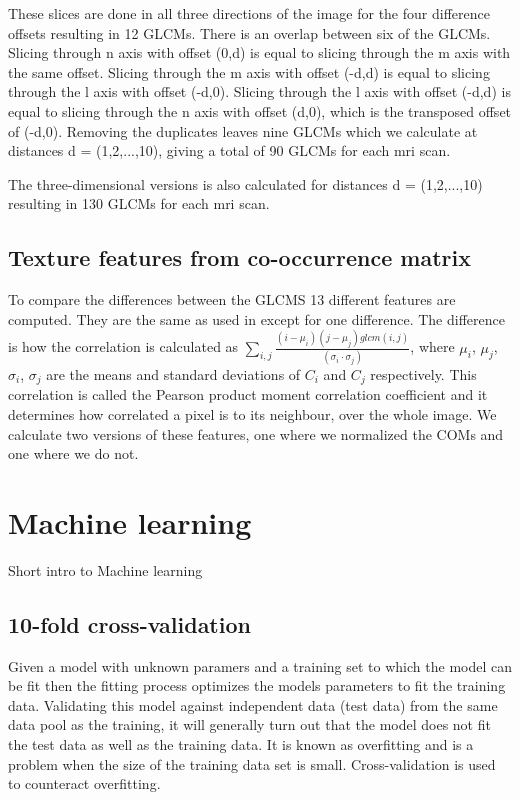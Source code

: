 These slices are done in all three directions of the image for the four difference offsets resulting in 12 GLCMs. There is an overlap between six of the GLCMs. Slicing through n axis with offset (0,d) is equal to slicing through the m axis with the same offset. Slicing through the m axis with offset (-d,d) is equal to slicing through the l axis with offset (-d,0). Slicing through the l axis with offset (-d,d) is equal to slicing through the n axis with offset (d,0), which is the transposed offset of (-d,0). Removing the duplicates leaves nine GLCMs which we calculate at distances d = (1,2,...,10), giving a total of 90 GLCMs for each mri scan.

The three-dimensional versions is also calculated for distances d = (1,2,...,10) resulting in 130 GLCMs for each mri scan.

\subsection{Texture features from co-occurrence matrix}
To compare the differences between the GLCMS 13 different features are computed. They are the same as used in \cite{MRfreeborough} except for one difference. The difference is how the correlation is calculated as $\sum_{i,j} \frac{(i-\mu_i)(j-\mu_j)glcm(i,j)}{(\sigma_i \cdot \sigma_j)}$, where $\mu_i$, $\mu_j$, $\sigma_i$, $\sigma_j$ are the means and standard deviations of $C_i$ and $C_j$ respectively. This correlation is called the Pearson product moment correlation coefficient and it determines how correlated a pixel is to its neighbour, over the whole image\cite{graycoprops}\cite{Pearson}. We calculate two versions of these features, one where we normalized the COMs and one where we do not.


\section{Machine learning}
Short intro to Machine learning

\subsection{10-fold cross-validation}
Given a model with unknown paramers and a training set to which the model can be fit then the fitting process optimizes the models parameters to fit the training data. Validating this model against independent data (test data) from the same data pool as the training, it will generally turn out that the model does not fit the test data as well as the training data. It is known as overfitting and is a problem when the size of the training data set is small. Cross-validation is used to counteract overfitting.

